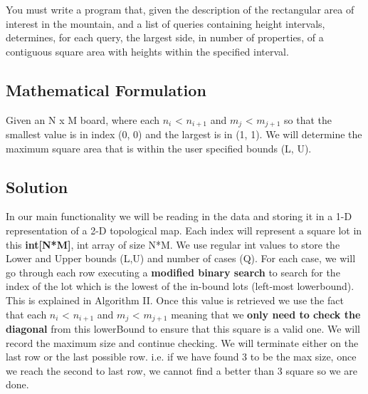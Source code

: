 \documentclass[12pt]{article}
\begin{document}
\indent You must write a program that, given the description of the rectangular area of interest in the
mountain, and a list of queries containing height intervals, determines, for each query, the largest side,
in number of properties, of a contiguous square area with heights within the specified interval.


\newpage

\subsection{Mathematical Formulation}
Given an N x M board, where each $n_i$ < $n_{i+1}$ and $m_j$ < $m_{j+1}$ so that the smallest value is
in index (0, 0) and the largest is in (1, 1). We will determine the maximum square area that is within
the user specified bounds (L, U).


\subsection{Solution}

In our main functionality we will be reading in the data and storing it in a 1-D representation of a
2-D topological map. Each index will represent a square lot in this \textbf{int[N*M]}, int array of
size N*M. We use regular int values to store the Lower and Upper bounds (L,U) and number of cases (Q).
For each case, we will go through each row executing a \textbf{modified binary search} to search for
the index of the lot which is the lowest of the in-bound lots (left-most lowerbound). This is explained
in Algorithm II. Once this value is retrieved we use the fact that each $n_i$ < $n_{i+1}$ and $m_j$ < $m_{j+1}$
meaning that we \textbf{only need to check the diagonal} from this lowerBound to ensure that this square
is a valid one. We will record the maximum size and continue checking. We will terminate either on the
last row or the last possible row. i.e. if we have found 3 to be the max size, once we reach the second
to last row, we cannot find a better than 3 square so we are done.
\end{document}
